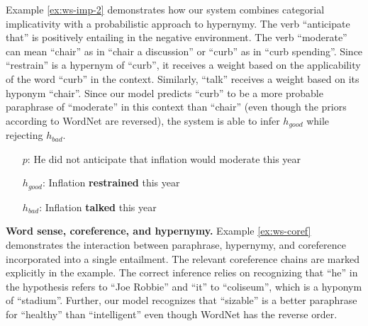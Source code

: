 Example \eqref{ex:ws-imp-2} demonstrates how our system combines
categorial implicativity with a probabilistic approach to hypernymy.  
The verb ``anticipate that'' is positively entailing in the negative
environment.
The verb ``moderate'' can mean ``chair'' as in ``chair a discussion'' or
``curb'' as in ``curb spending''.  Since ``restrain'' is a hypernym of
``curb'', it receives a weight based on the applicability of the word ``curb''
in the context.  Similarly, ``talk'' receives a weight based on its
hyponym ``chair''. Since our model predicts ``curb'' to be a more probable
paraphrase of ``moderate'' in this context than ``chair'' (even though the
priors according to WordNet are reversed), the system is able to infer
$h_{good}$ while rejecting $h_{bad}$.

\begin{example}\label{ex:ws-imp-2}
\begin{itemize}
  \item[$p$:] He did not anticipate that inflation would moderate this year
  \item[$h_{good}$:] Inflation {\bf restrained} this year
  \item[$h_{bad}$:] Inflation {\bf talked} this year
\end{itemize} 
\end{example}



\noindent\textbf{Word sense, coreference, and hypernymy.}
Example \eqref{ex:ws-coref} demonstrates the interaction between paraphrase,
hypernymy, and coreference incorporated into a single entailment.  The
relevant coreference chains are marked explicitly in the example.  The correct
inference relies on recognizing that ``he'' in the hypothesis refers to ``Joe
Robbie'' and ``it'' to ``coliseum'', which is a hyponym of ``stadium''. 
Further, our model recognizes that ``sizable'' is a better paraphrase for
``healthy'' than ``intelligent'' even though WordNet has the reverse order.

